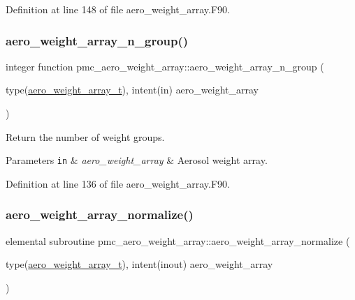 Definition at line 148 of file aero\+\_\+weight\+\_\+array.\+F90.

\mbox{\label{namespacepmc__aero__weight__array_ac03a66965bebb2e5b699f16acc021962}} 
\subsubsection{\texorpdfstring{aero\+\_\+weight\+\_\+array\+\_\+n\+\_\+group()}{aero\_weight\_array\_n\_group()}}
{\footnotesize\ttfamily integer function pmc\+\_\+aero\+\_\+weight\+\_\+array\+::aero\+\_\+weight\+\_\+array\+\_\+n\+\_\+group (\begin{DoxyParamCaption}\item[{type(\mbox{\hyperlink{structpmc__aero__weight__array_1_1aero__weight__array__t}{aero\+\_\+weight\+\_\+array\+\_\+t}}), intent(in)}]{aero\+\_\+weight\+\_\+array }\end{DoxyParamCaption})}



Return the number of weight groups. 


\begin{DoxyParams}[1]{Parameters}
\mbox{\tt in}  & {\em aero\+\_\+weight\+\_\+array} & Aerosol weight array. \\
\hline
\end{DoxyParams}


Definition at line 136 of file aero\+\_\+weight\+\_\+array.\+F90.

\mbox{\label{namespacepmc__aero__weight__array_a4faf647ac7900cdcac273e4167e8e088}} 
\subsubsection{\texorpdfstring{aero\+\_\+weight\+\_\+array\+\_\+normalize()}{aero\_weight\_array\_normalize()}}
{\footnotesize\ttfamily elemental subroutine pmc\+\_\+aero\+\_\+weight\+\_\+array\+::aero\+\_\+weight\+\_\+array\+\_\+normalize (\begin{DoxyParamCaption}\item[{type(\mbox{\hyperlink{structpmc__aero__weight__array_1_1aero__weight__array__t}{aero\+\_\+weight\+\_\+array\+\_\+t}}), intent(inout)}]{aero\+\_\+weight\+\_\+array }\end{DoxyParamCaption})}



